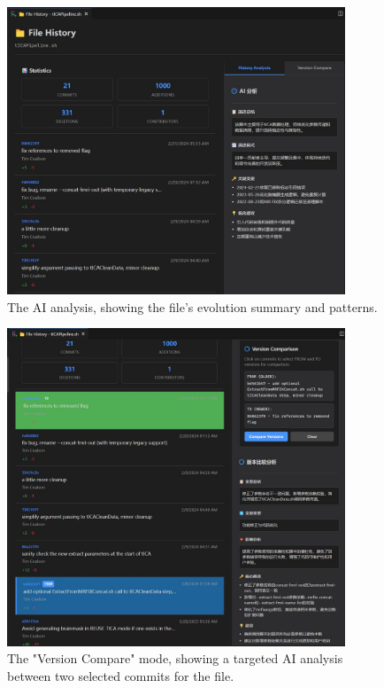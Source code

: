 \begin{figure}[h!]
    \centering
    \includegraphics[width=0.9\textwidth]{figures/use-case-3-history-loaded.jpg}
    \caption{The AI analysis, showing the file's evolution summary and patterns.}
    \label{fig:use-case-3-history-loaded}
\end{figure}

\begin{figure}[h!]
    \centering
    \includegraphics[width=0.9\textwidth]{figures/use-case-3-version-compare.jpg}
    \caption{The "Version Compare" mode, showing a targeted AI analysis between two selected commits for the file.}
    \label{fig:use-case-3-version-compare}
\end{figure} 
